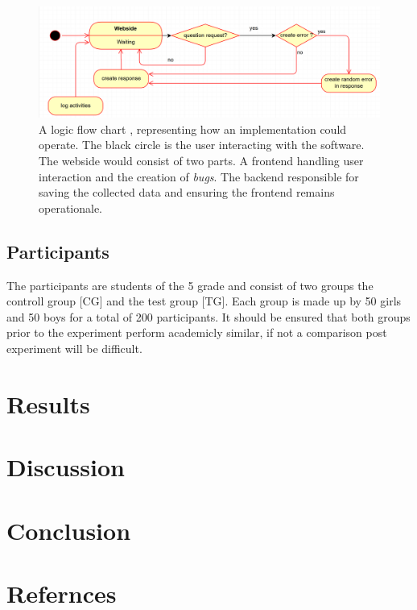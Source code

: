 \documentclass[runningheads]{llncs}
\begin{document}
\begin{figure}
    \includegraphics[width=\textwidth]{UML Prototyp.PNG}
    \caption{A logic flow chart , representing how an implementation could operate.
    The black circle is the user interacting with the software. The webside would
    consist of two parts. A frontend handling user interaction and the creation of {\itshape bugs}.
    The backend responsible for saving the collected data and ensuring the frontend
    remains operationale.} \label{fig1}
\end{figure}

\subsection{Participants}
The participants are students of the 5 grade and consist of two groups the controll group [CG] and
the test group [TG]. Each group is made up by 50 girls and 50 boys for a total of 200 participants.
It should be ensured that both groups prior to the experiment perform academicly similar, if not a
comparison post experiment will be difficult.

\section{Results}
\section{Discussion}
\section{Conclusion}
\section{Refernces}
\end{document}
